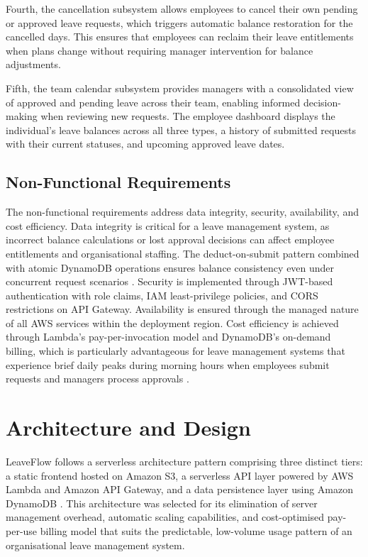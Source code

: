 \documentclass[conference]{IEEEtran}
\begin{document}
Fourth, the cancellation subsystem allows employees to cancel their own pending or approved leave requests, which triggers automatic balance restoration for the cancelled days. This ensures that employees can reclaim their leave entitlements when plans change without requiring manager intervention for balance adjustments.

Fifth, the team calendar subsystem provides managers with a consolidated view of approved and pending leave across their team, enabling informed decision-making when reviewing new requests. The employee dashboard displays the individual's leave balances across all three types, a history of submitted requests with their current statuses, and upcoming approved leave dates.

\subsection{Non-Functional Requirements}

The non-functional requirements address data integrity, security, availability, and cost efficiency. Data integrity is critical for a leave management system, as incorrect balance calculations or lost approval decisions can affect employee entitlements and organisational staffing. The deduct-on-submit pattern combined with atomic DynamoDB operations ensures balance consistency even under concurrent request scenarios \cite{awsdynamodb}. Security is implemented through JWT-based authentication with role claims, IAM least-privilege policies, and CORS restrictions on API Gateway. Availability is ensured through the managed nature of all AWS services within the deployment region. Cost efficiency is achieved through Lambda's pay-per-invocation model and DynamoDB's on-demand billing, which is particularly advantageous for leave management systems that experience brief daily peaks during morning hours when employees submit requests and managers process approvals \cite{awslambda}.

\section{Architecture and Design}

LeaveFlow follows a serverless architecture pattern comprising three distinct tiers: a static frontend hosted on Amazon S3, a serverless API layer powered by AWS Lambda and Amazon API Gateway, and a data persistence layer using Amazon DynamoDB \cite{cloudpatterns}. This architecture was selected for its elimination of server management overhead, automatic scaling capabilities, and cost-optimised pay-per-use billing model that suits the predictable, low-volume usage pattern of an organisational leave management system.
\end{document}
